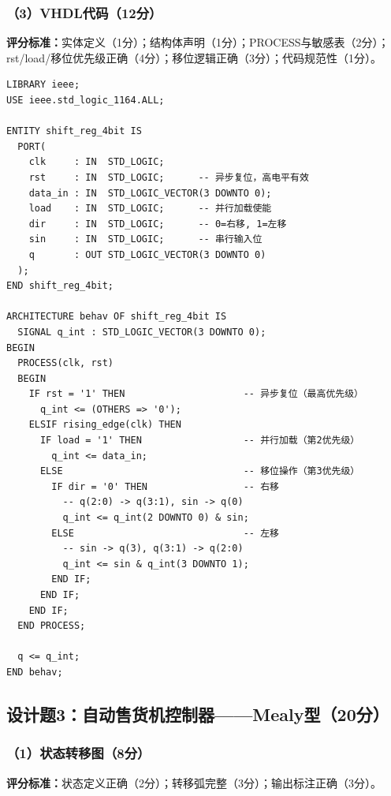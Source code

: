 \subsubsection{（3）VHDL代码（12分）}

\begin{framed}
\textbf{评分标准：}实体定义（1分）；结构体声明（1分）；PROCESS与敏感表（2分）；rst/load/移位优先级正确（4分）；移位逻辑正确（3分）；代码规范性（1分）。
\end{framed}

\begin{lstlisting}[language=VDL, caption={4位双向移位寄存器VHDL代码——行为描述}]
LIBRARY ieee;
USE ieee.std_logic_1164.ALL;

ENTITY shift_reg_4bit IS
  PORT(
    clk     : IN  STD_LOGIC;
    rst     : IN  STD_LOGIC;      -- 异步复位，高电平有效
    data_in : IN  STD_LOGIC_VECTOR(3 DOWNTO 0);
    load    : IN  STD_LOGIC;      -- 并行加载使能
    dir     : IN  STD_LOGIC;      -- 0=右移, 1=左移
    sin     : IN  STD_LOGIC;      -- 串行输入位
    q       : OUT STD_LOGIC_VECTOR(3 DOWNTO 0)
  );
END shift_reg_4bit;

ARCHITECTURE behav OF shift_reg_4bit IS
  SIGNAL q_int : STD_LOGIC_VECTOR(3 DOWNTO 0);
BEGIN
  PROCESS(clk, rst)
  BEGIN
    IF rst = '1' THEN                     -- 异步复位（最高优先级）
      q_int <= (OTHERS => '0');
    ELSIF rising_edge(clk) THEN
      IF load = '1' THEN                  -- 并行加载（第2优先级）
        q_int <= data_in;
      ELSE                                -- 移位操作（第3优先级）
        IF dir = '0' THEN                 -- 右移
          -- q(2:0) -> q(3:1), sin -> q(0)
          q_int <= q_int(2 DOWNTO 0) & sin;
        ELSE                              -- 左移
          -- sin -> q(3), q(3:1) -> q(2:0)
          q_int <= sin & q_int(3 DOWNTO 1);
        END IF;
      END IF;
    END IF;
  END PROCESS;

  q <= q_int;
END behav;
\end{lstlisting}

\subsection{设计题3：自动售货机控制器——Mealy型（20分）}

\subsubsection{（1）状态转移图（8分）}

\begin{framed}
\textbf{评分标准：}状态定义正确（2分）；转移弧完整（3分）；输出标注正确（3分）。
\end{framed}

